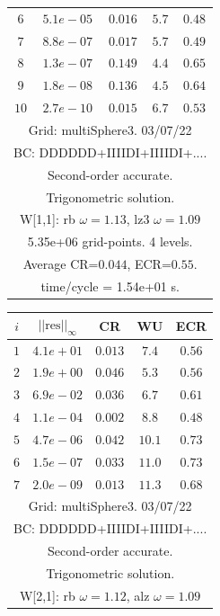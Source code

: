 \begin{table}[hbt]
\begin{center}
{\begin{tabular}{|c|c|c|c|c|}
 $ 6$  & $ 5.1e-05$ & $0.016$ & $ 5.7$ & $0.48$ \\ 
 $ 7$  & $ 8.8e-07$ & $0.017$ & $ 5.7$ & $0.49$ \\ 
 $ 8$  & $ 1.3e-07$ & $0.149$ & $ 4.4$ & $0.65$ \\ 
 $ 9$  & $ 1.8e-08$ & $0.136$ & $ 4.5$ & $0.64$ \\ 
 $10$  & $ 2.7e-10$ & $0.015$ & $ 6.7$ & $0.53$ \\ 
\hline 
\multicolumn{5}{|c|}{Grid: multiSphere3. 03/07/22}  \\
\multicolumn{5}{|c|}{BC: DDDDDD+IIIIDI+IIIIDI+....}  \\
\multicolumn{5}{|c|}{Second-order accurate.}  \\
\multicolumn{5}{|c|}{Trigonometric solution.}  \\
\multicolumn{5}{|c|}{W[1,1]: rb $\omega=1.13$, lz3 $\omega=1.09$}  \\
\multicolumn{5}{|c|}{5.35e+06 grid-points. 4 levels.}  \\
\multicolumn{5}{|c|}{Average CR=$0.044$, ECR=$0.55$.}  \\
\multicolumn{5}{|c|}{time/cycle = 1.54e+01 s.}  \\
\hline 
\end{tabular}
\begin{tabular}{|c|c|c|c|c|} \hline 
 $i$   & $\vert\vert\mbox{res}\vert\vert_\infty$  &  CR     &  WU    & ECR  \\   \hline 
 $ 1$  & $ 4.1e+01$ & $0.013$ & $ 7.4$ & $0.56$ \\ 
 $ 2$  & $ 1.9e+00$ & $0.046$ & $ 5.3$ & $0.56$ \\ 
 $ 3$  & $ 6.9e-02$ & $0.036$ & $ 6.7$ & $0.61$ \\ 
 $ 4$  & $ 1.1e-04$ & $0.002$ & $ 8.8$ & $0.48$ \\ 
 $ 5$  & $ 4.7e-06$ & $0.042$ & $10.1$ & $0.73$ \\ 
 $ 6$  & $ 1.5e-07$ & $0.033$ & $11.0$ & $0.73$ \\ 
 $ 7$  & $ 2.0e-09$ & $0.013$ & $11.3$ & $0.68$ \\ 
\hline 
\multicolumn{5}{|c|}{Grid: multiSphere3. 03/07/22}  \\
\multicolumn{5}{|c|}{BC: DDDDDD+IIIIDI+IIIIDI+....}  \\
\multicolumn{5}{|c|}{Second-order accurate.}  \\
\multicolumn{5}{|c|}{Trigonometric solution.}  \\
\multicolumn{5}{|c|}{W[2,1]: rb $\omega=1.12$, alz $\omega=1.09$}  \\

\end{tabular}}
\end{center}
\end{table}
